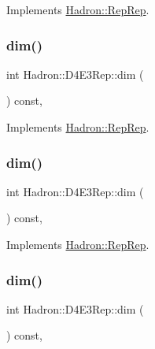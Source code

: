 Implements \mbox{\hyperlink{structHadron_1_1RepRep_a92c8802e5ed7afd7da43ccfd5b7cd92b}{Hadron\+::\+Rep\+Rep}}.

\mbox{\label{structHadron_1_1D4E3Rep_a7e048ba087ccbf5ddfade8be991509a0}} 
\subsubsection{\texorpdfstring{dim()}{dim()}\hspace{0.1cm}{\footnotesize\ttfamily [3/5]}}
{\footnotesize\ttfamily int Hadron\+::\+D4\+E3\+Rep\+::dim (\begin{DoxyParamCaption}{ }\end{DoxyParamCaption}) const\hspace{0.3cm}{\ttfamily [inline]}, {\ttfamily [virtual]}}



Implements \mbox{\hyperlink{structHadron_1_1RepRep_a92c8802e5ed7afd7da43ccfd5b7cd92b}{Hadron\+::\+Rep\+Rep}}.

\mbox{\label{structHadron_1_1D4E3Rep_a7e048ba087ccbf5ddfade8be991509a0}} 
\subsubsection{\texorpdfstring{dim()}{dim()}\hspace{0.1cm}{\footnotesize\ttfamily [4/5]}}
{\footnotesize\ttfamily int Hadron\+::\+D4\+E3\+Rep\+::dim (\begin{DoxyParamCaption}{ }\end{DoxyParamCaption}) const\hspace{0.3cm}{\ttfamily [inline]}, {\ttfamily [virtual]}}



Implements \mbox{\hyperlink{structHadron_1_1RepRep_a92c8802e5ed7afd7da43ccfd5b7cd92b}{Hadron\+::\+Rep\+Rep}}.

\mbox{\label{structHadron_1_1D4E3Rep_a7e048ba087ccbf5ddfade8be991509a0}} 
\subsubsection{\texorpdfstring{dim()}{dim()}\hspace{0.1cm}{\footnotesize\ttfamily [5/5]}}
{\footnotesize\ttfamily int Hadron\+::\+D4\+E3\+Rep\+::dim (\begin{DoxyParamCaption}{ }\end{DoxyParamCaption}) const\hspace{0.3cm}{\ttfamily [inline]}, {\ttfamily [virtual]}}



